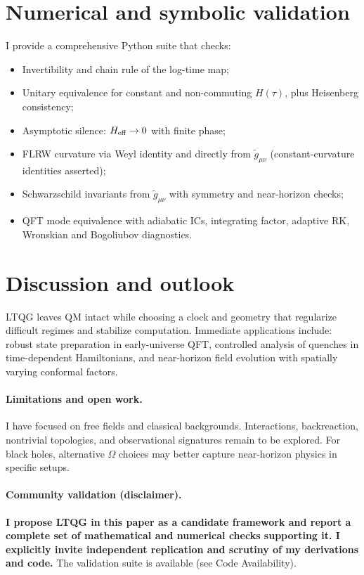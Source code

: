 \documentclass[aps,prd,onecolumn,superscriptaddress,nofootinbib]{revtex4-2}
\begin{document}
\section{Numerical and symbolic validation}
I provide a comprehensive Python suite that checks:
\begin{itemize}
\item Invertibility and chain rule of the log-time map;
\item Unitary equivalence for constant and non-commuting $H(\tau)$, plus Heisenberg consistency;
\item Asymptotic silence: $H_{\rm eff}\to 0$ with finite phase;
\item FLRW curvature via Weyl identity and directly from $\tilde g_{\mu\nu}$ (constant-curvature identities asserted);
\item Schwarzschild invariants from $\tilde g_{\mu\nu}$ with symmetry and near-horizon checks;
\item QFT mode equivalence with adiabatic ICs, integrating factor, adaptive RK, Wronskian and Bogoliubov diagnostics.
\end{itemize}

\section{Discussion and outlook}
LTQG leaves QM intact while choosing a clock and geometry that regularize difficult regimes and stabilize computation. Immediate applications include: robust state preparation in early-universe QFT, controlled analysis of quenches in time-dependent Hamiltonians, and near-horizon field evolution with spatially varying conformal factors.

\paragraph*{Limitations and open work.}
I have focused on free fields and classical backgrounds. Interactions, backreaction, nontrivial topologies, and observational signatures remain to be explored. For black holes, alternative $\Omega$ choices may better capture near-horizon physics in specific setups.

\paragraph*{Community validation (disclaimer).}
\textbf{I propose LTQG in this paper as a candidate framework and report a complete set of mathematical and numerical checks supporting it. I explicitly invite independent replication and scrutiny of my derivations and code.} The validation suite is available (see Code Availability).
\end{document}
